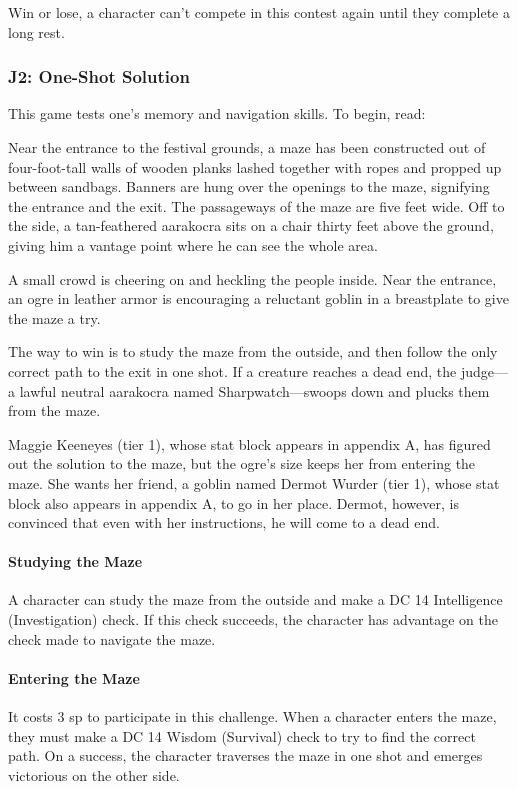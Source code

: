 \documentclass[10pt,a4paper,twoside,bg=print,twocolumn,openany,nodeprecatedcode]{dndbook}
\begin{document}
Win or lose, a character can't compete in this contest again until they complete a long rest.


\subsubsection{J2: One-Shot Solution}
This game tests one's memory and navigation skills. To begin, read:

\begin{DndReadAloud}{}
Near the entrance to the festival grounds, a maze has been constructed out of four-foot-tall walls of wooden planks lashed together with ropes and propped up between sandbags. Banners are hung over the openings to the maze, signifying the entrance and the exit. The passageways of the maze are five feet wide. Off to the side, a tan-feathered aarakocra sits on a chair thirty feet above the ground, giving him a vantage point where he can see the whole area.

A small crowd is cheering on and heckling the people inside. Near the entrance, an ogre in leather armor is encouraging a reluctant goblin in a breastplate to give the maze a try.

\end{DndReadAloud}

The way to win is to study the maze from the outside, and then follow the only correct path to the exit in one shot. If a creature reaches a dead end, the judge—a lawful neutral aarakocra named Sharpwatch—swoops down and plucks them from the maze.

Maggie Keeneyes (tier 1), whose stat block appears in appendix A, has figured out the solution to the maze, but the ogre's size keeps her from entering the maze. She wants her friend, a goblin named Dermot Wurder (tier 1), whose stat block also appears in appendix A, to go in her place. Dermot, however, is convinced that even with her instructions, he will come to a dead end.

\paragraph{Studying the Maze}
A character can study the maze from the outside and make a DC 14 Intelligence (Investigation) check. If this check succeeds, the character has advantage on the check made to navigate the maze.

\paragraph{Entering the Maze}
It costs 3 sp to participate in this challenge. When a character enters the maze, they must make a DC 14 Wisdom (Survival) check to try to find the correct path. On a success, the character traverses the maze in one shot and emerges victorious on the other side.
\end{document}
